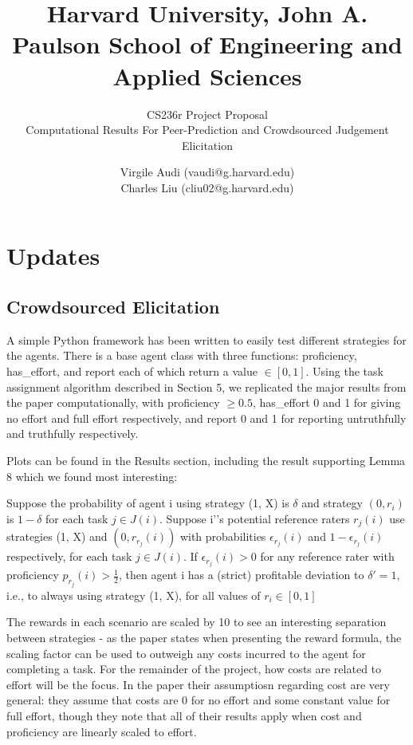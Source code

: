 \documentclass{scrartcl}
\title{Harvard University, John A. Paulson School of Engineering and Applied Sciences \newline}
\subtitle{CS236r Project Proposal\\ Computational Results For Peer-Prediction and Crowdsourced Judgement Elicitation}
\author{Virgile Audi (vaudi@g.harvard.edu)\\
		Charles Liu (cliu02@g.harvard.edu)}
\begin{document}
 
\maketitle
	  
\section{Updates}
\subsection{Crowdsourced Elicitation}
A simple Python framework has been written to easily test different strategies for the agents. There is a base agent class with three functions: proficiency, has\_effort, and report each of which return a value $\in [0,1]$. Using the task assignment algorithm described in Section 5, we replicated the major results from the paper computationally, with proficiency $\geq 0.5$, has\_effort 0 and 1 for giving no effort and full effort respectively, and report 0 and 1 for reporting untruthfully and truthfully respectively.

Plots can be found in the Results section, including the result supporting Lemma 8 which we found most interesting: 
\begin{displayquote}
Suppose the probability of agent i using strategy (1, X) is $\delta$ and strategy $(0, r_i)$ is $1-\delta$ for each task $j \in J(i)$. Suppose i'’s potential reference raters $r_j (i)$ use strategies (1, X) and $(0, r_{r_j} (i))$ with probabilities $\epsilon_{r_j}(i)$ and $1-\epsilon_{r_j}(i)$ respectively, for each task $j \in J(i)$. If $\epsilon_{r_j}(i) > 0$ for any reference rater with proficiency $p_{r_j} (i) > \frac{1}{2}$, then agent i has a (strict) profitable deviation to $\delta'=1$, i.e., to always using strategy (1, X), for all values of $r_i \in [0,1]$
\end{displayquote}

The rewards in each scenario are scaled by 10 to see an interesting separation between strategies - as the paper states when presenting the reward formula, the scaling factor can be used to outweigh any costs incurred to the agent for completing a task. For the remainder of the project, how costs are related to effort will be the focus. In the paper their assumptiosn regarding cost are very general: they assume that costs are 0 for no effort and some constant value for full effort, though they note that all of their results apply when cost and proficiency are linearly scaled to effort. 
\end{document}

